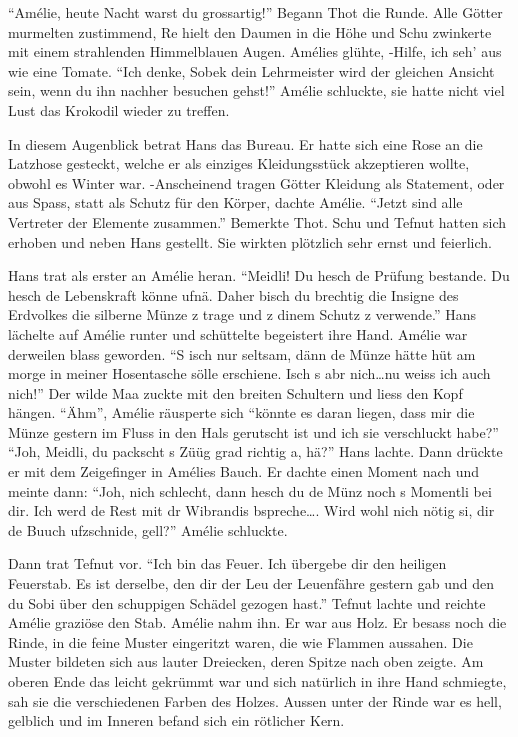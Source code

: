 \documentclass[11pt,titlepage,a5paper]{book}
\begin{document}
"`Amélie, heute Nacht warst du grossartig!"' Begann Thot die Runde. Alle Götter murmelten zustimmend, Re hielt den Daumen in die Höhe und Schu zwinkerte mit einem strahlenden Himmelblauen Augen. Amélies glühte, -Hilfe, ich seh' aus wie eine Tomate. "`Ich denke, Sobek dein Lehrmeister wird der gleichen Ansicht sein, wenn du ihn nachher besuchen gehst!"' Amélie schluckte, sie hatte nicht viel Lust das Krokodil wieder zu treffen. 

In diesem Augenblick betrat Hans das Bureau. Er hatte sich eine Rose an die Latzhose gesteckt, welche er als einziges Kleidungsstück akzeptieren wollte, obwohl es Winter war. -Anscheinend tragen Götter Kleidung als Statement, oder aus Spass, statt als Schutz für den Körper, dachte Amélie. "`Jetzt sind alle Vertreter der Elemente zusammen."' Bemerkte Thot. Schu und Tefnut hatten sich erhoben und neben Hans gestellt. Sie wirkten plötzlich sehr ernst und feierlich. 

Hans trat als erster an Amélie heran. "`Meidli!  Du hesch de Prüfung bestande. Du hesch de Lebenskraft könne ufnä. Daher bisch du brechtig die Insigne des Erdvolkes die silberne Münze z trage und z dinem Schutz z verwende."' Hans lächelte auf Amélie runter und schüttelte begeistert ihre Hand. Amélie war derweilen blass geworden. "`S isch nur seltsam, dänn de Münze hätte hüt am morge in meiner Hosentasche sölle erschiene. Isch s abr nich\dots nu weiss ich auch nich!"' Der wilde Maa zuckte mit den breiten Schultern und liess den Kopf hängen. "`Ähm"', Amélie räusperte sich "`könnte es daran liegen, dass mir die Münze gestern im Fluss in den Hals gerutscht ist und ich sie verschluckt habe?"' "`Joh, Meidli, du packscht s Züüg grad richtig a, hä?"' Hans lachte. Dann drückte er mit dem Zeigefinger in Amélies Bauch. Er dachte einen Moment nach und meinte dann: "`Joh, nich schlecht, dann hesch du de Münz noch s Momentli bei dir. Ich werd de Rest mit dr Wibrandis bspreche\dots. Wird wohl nich nötig si, dir de Buuch ufzschnide, gell?"' Amélie schluckte.

Dann trat Tefnut vor. "`Ich bin das Feuer. Ich übergebe dir den heiligen Feuerstab. Es ist derselbe, den dir der Leu der Leuenfähre gestern gab und den du Sobi über den schuppigen Schädel gezogen hast."' Tefnut lachte und reichte Amélie graziöse den Stab. Amélie nahm ihn. Er war aus Holz. Er besass noch die Rinde, in die feine Muster eingeritzt waren, die wie Flammen aussahen. Die Muster bildeten sich aus lauter Dreiecken, deren Spitze nach oben zeigte. Am oberen Ende das leicht gekrümmt war und sich natürlich in ihre Hand schmiegte, sah sie die verschiedenen Farben des Holzes. Aussen unter der Rinde war es hell, gelblich und im Inneren befand sich ein rötlicher Kern.
\end{document}

